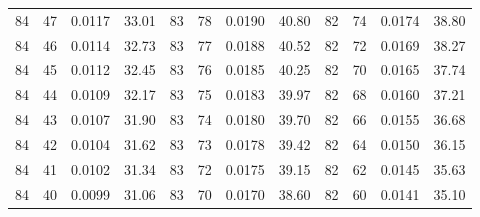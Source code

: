 \begin{tabular}{llll|llll|llll}
84 & 47 & 0.0117 & 33.01 & 83 & 78 & 0.0190 & 40.80 & 82 & 74 & 0.0174 & 38.80\\
84 & 46 & 0.0114 & 32.73 & 83 & 77 & 0.0188 & 40.52 & 82 & 72 & 0.0169 & 38.27\\
84 & 45 & 0.0112 & 32.45 & 83 & 76 & 0.0185 & 40.25 & 82 & 70 & 0.0165 & 37.74\\
84 & 44 & 0.0109 & 32.17 & 83 & 75 & 0.0183 & 39.97 & 82 & 68 & 0.0160 & 37.21\\
84 & 43 & 0.0107 & 31.90 & 83 & 74 & 0.0180 & 39.70 & 82 & 66 & 0.0155 & 36.68\\
84 & 42 & 0.0104 & 31.62 & 83 & 73 & 0.0178 & 39.42 & 82 & 64 & 0.0150 & 36.15\\
84 & 41 & 0.0102 & 31.34 & 83 & 72 & 0.0175 & 39.15 & 82 & 62 & 0.0145 & 35.63\\
84 & 40 & 0.0099 & 31.06 & 83 & 70 & 0.0170 & 38.60 & 82 & 60 & 0.0141 & 35.10\\
\bottomrule
\end{tabular}
\newpage
